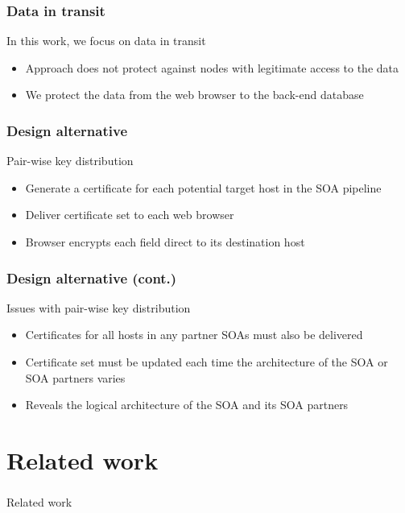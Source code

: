 \documentclass{beamer}
\begin{document}
\begin{frame}
\frametitle{Data in transit}
In this work, we focus on data in transit
\smallskip
\begin{itemize}
\item Approach does not protect against nodes with legitimate access to the data
\item We protect the data from the web browser to the back-end database
\end{itemize}
\end{frame}


\begin{frame}
\frametitle{Design alternative}
Pair-wise key distribution
\smallskip
\begin{itemize}
\item Generate a certificate for each potential target host in the SOA pipeline
\item Deliver certificate set to each web browser
\item Browser encrypts each field direct to its destination host 
\end{itemize}
\end{frame}

\begin{frame}
\frametitle{Design alternative (cont.)}
Issues with pair-wise key distribution
\begin{itemize}
\item Certificates for all hosts in any partner SOAs must also be delivered
\item Certificate set must be updated each time the architecture of the SOA or
SOA partners varies
\item Reveals the logical architecture of the SOA and its SOA partners
\end{itemize}
\end{frame}

\section{Related work}
\begin{frame}
\frametitle{}
\begin{center}
Related work
\end{center}
\end{frame}
\end{document}
